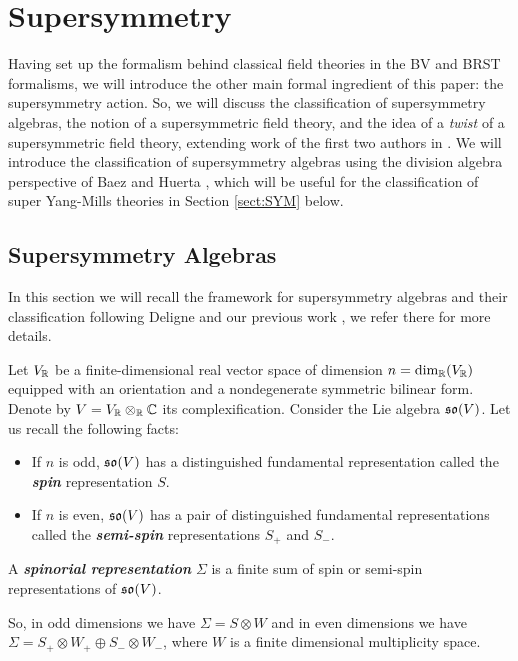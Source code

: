 \documentclass[10pt, oneside]{article}
\newcommand{\defterm}[1]{\textbf{\emph{#1}}}
\begin{document}
\section{Supersymmetry} \label{sect:susy}
Having set up the formalism behind classical field theories in the BV and BRST formalisms, we will introduce the other main formal ingredient of this paper: the supersymmetry action.  So, we will discuss the classification of supersymmetry algebras, the notion of a supersymmetric field theory, and the idea of a \emph{twist} of a supersymmetric field theory, extending work of the first two authors in \cite{ElliottSafronov}.  We will introduce the classification of supersymmetry algebras using the division algebra perspective of Baez and Huerta \cite{BaezHuerta}, which will be useful for the classification of super Yang-Mills theories in Section \ref{sect:SYM} below.

\subsection{Supersymmetry Algebras} \label{sect:susyalgebras}
In this section we will recall the framework for supersymmetry algebras and their classification following Deligne \cite{DeligneSpinors} and our previous work \cite{ElliottSafronov}, we refer there for more details.

Let $V_\mathbb R$ be a finite-dimensional real vector space of dimension $n=\dim_\mathbb R(V_\mathbb R)$ equipped with an orientation and a nondegenerate symmetric bilinear form. Denote by $V=V_\mathbb R\otimes_\mathbb R\mathbb C$ its complexification. Consider the Lie algebra $\mathfrak{so}(V)$. Let us recall the following facts:
\begin{itemize}
\item If $n$ is odd, $\mathfrak{so}(V)$ has a distinguished fundamental representation called the \defterm{spin} representation $S$.

\item If $n$ is even, $\mathfrak{so}(V)$ has a pair of distinguished fundamental representations called the \defterm{semi-spin} representations $S_+$ and $S_-$.
\end{itemize}

\begin{definition}
A \defterm{spinorial representation} $\Sigma$ is a finite sum of spin or semi-spin representations of $\mathfrak{so}(V)$.
\end{definition}

So, in odd dimensions we have $\Sigma=S\otimes W$ and in even dimensions we have $\Sigma=S_+\otimes W_+\oplus S_-\otimes W_-$, where $W$ is a finite dimensional multiplicity space.
\end{document}
